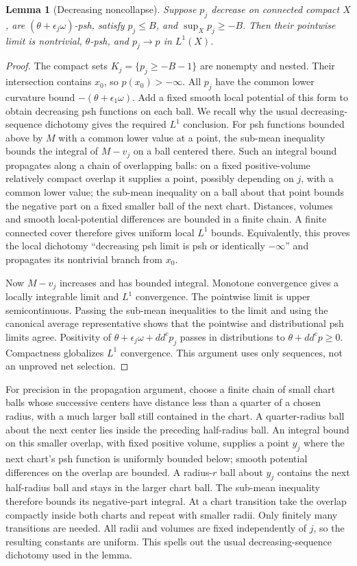 \documentclass[11pt]{article}
\newtheorem{lemma}[theorem]{Lemma}
\theoremstyle{definition}
\begin{document}
\begin{lemma}[Decreasing noncollapse]
Suppose $p_j$ decrease on connected compact $X$, are
$(\theta+\epsilon_j\omega)$-psh, satisfy $p_j\leq B$, and
$\sup_Xp_j\geq-B$. Then their pointwise limit is nontrivial,
$\theta$-psh, and $p_j\to p$ in $L^1(X)$.
\end{lemma}
\begin{proof}
The compact sets $K_j=\{p_j\geq-B-1\}$ are nonempty and
nested. Their intersection contains $x_0$, so $p(x_0)>-\infty$.
All $p_j$ have the common lower curvature bound
$-(\theta+\epsilon_1\omega)$. Add a fixed smooth local potential
of this form to obtain decreasing psh functions on each ball.
We recall why the usual decreasing-sequence dichotomy gives the
required $L^1$ conclusion. For psh functions bounded above by $M$
with a common lower value at a point, the sub-mean inequality
bounds the integral of $M-v_j$ on a ball centered there. Such
an integral bound propagates along a chain of overlapping balls:
on a fixed positive-volume relatively compact overlap it supplies
a point, possibly depending on $j$, with a common lower value;
the sub-mean inequality on a ball about that point bounds the
negative part on a fixed smaller ball of the next chart. Distances,
volumes and smooth local-potential differences are bounded in a
finite chain. A finite connected cover therefore gives uniform
local $L^1$ bounds. Equivalently, this proves the local dichotomy
``decreasing psh limit is psh or identically $-\infty$'' and
propagates its nontrivial branch from $x_0$.

Now $M-v_j$ increases and has bounded integral. Monotone convergence
gives a locally integrable limit and $L^1$ convergence. The pointwise
limit is upper semicontinuous. Passing the sub-mean inequalities to
the limit and using the canonical average representative shows
that the pointwise and distributional psh limits agree. Positivity
of $\theta+\epsilon_j\omega+dd^cp_j$ passes in distributions to
$\theta+dd^cp\geq0$. Compactness globalizes $L^1$ convergence.
This argument uses only sequences, not an unproved net selection.
\end{proof}
For precision in the propagation argument, choose a finite chain of
small chart balls whose successive centers have distance less than a
quarter of a chosen radius, with a much larger ball still contained in
the chart. A quarter-radius ball about the next center lies inside
the preceding half-radius ball. An integral bound on this smaller
overlap, with fixed positive volume, supplies a point $y_j$ where the
next chart's psh function is uniformly bounded below; smooth potential
differences on the overlap are bounded. A radius-$r$ ball about $y_j$
contains the next half-radius ball and stays in the larger chart ball.
The sub-mean inequality therefore bounds its negative-part integral.
At a chart transition take the overlap compactly inside both charts
and repeat with smaller radii. Only finitely many transitions are
needed. All radii and volumes are fixed independently of $j$, so
the resulting constants are uniform. This spells out the usual
decreasing-sequence dichotomy used in the lemma.
\end{document}
